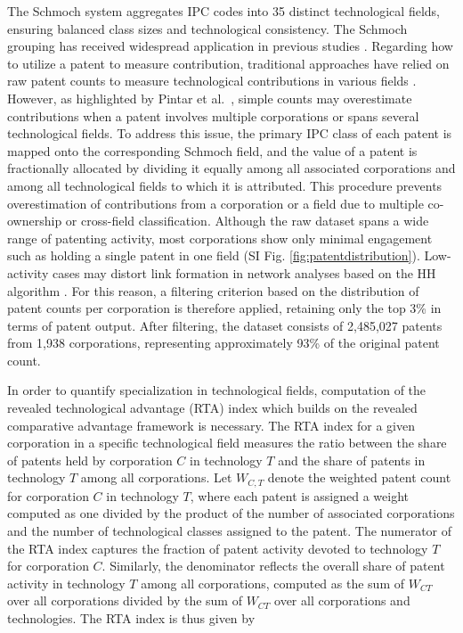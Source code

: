 \documentclass[fleqn,10pt]{wlscirep}
\begin{document}
The Schmoch system aggregates IPC codes into 35 distinct technological fields, ensuring balanced class sizes and technological consistency. The Schmoch grouping has received widespread application in previous studies \cite{PintarScherngell2022,Balland2018,Whittle2019}.
Regarding how to utilize a patent to measure contribution, traditional approaches have relied on raw patent counts to measure technological contributions in various fields \cite{Balland2016,Balland2018,PintarScherngell2022,Pinheiro2022,Whittle2019,Jun2023,Abay2024}. However, as highlighted by Pintar et al.\ \cite{PintarScherngell2022}, simple counts may overestimate contributions when a patent involves multiple corporations or spans several technological fields.
To address this issue, the primary IPC class of each patent is mapped onto the corresponding Schmoch field, and the value of a patent is fractionally allocated by dividing it equally among all associated corporations and among all technological fields to which it is attributed. This procedure prevents overestimation of contributions from a corporation or a field due to multiple co-ownership or cross-field classification.
Although the raw dataset spans a wide range of patenting activity, most corporations show only minimal engagement such as holding a single patent in one field (SI Fig. \ref{fig:patentdistribution}). 
Low-activity cases may distort link formation in network analyses based on the HH algorithm \cite{PintarScherngell2022}. 
For this reason, a filtering criterion based on the distribution of patent counts per corporation is therefore applied, retaining only the top 3\% in terms of patent output. After filtering, the dataset consists of 2,485,027 patents from 1,938 corporations, representing approximately 93\% of the original patent count.

In order to quantify specialization in technological fields, computation of the revealed technological advantage (RTA)\cite{Soete1987} index which builds on the revealed comparative advantage framework\cite{Balassa1965} is necessary.
The RTA index for a given corporation in a specific technological field measures the ratio between the share of patents held by corporation \(C\) in technology \(T\) and the share of patents in technology \(T\) among all corporations.
Let \(W_{C,T}\) denote the weighted patent count for corporation \(C\) in technology \(T\), where each patent is assigned a weight computed as one divided by the product of the number of associated corporations and the number of technological classes assigned to the patent.
The numerator of the RTA index captures the fraction of patent activity devoted to technology \(T\) for corporation \(C\). 
Similarly, the denominator reflects the overall share of patent activity in technology \(T\) among all corporations, computed as the sum of \(W_{CT}\) over all corporations divided by the sum of \(W_{CT}\) over all corporations and technologies.
The RTA index is thus given by
\end{document}
